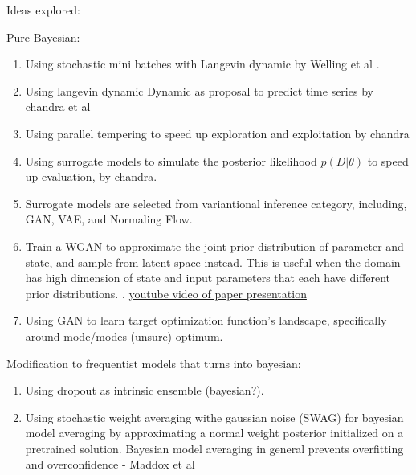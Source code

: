 \documentclass[honours,12pt]{unswthesis}
\numberwithin{equation}{section}
\begin{document}

\noindent Ideas explored: 

Pure Bayesian:

\begin{enumerate}
\item Using stochastic mini batches with Langevin dynamic by Welling et al \cite{StochGradLangevin}.

\item Using langevin dynamic Dynamic as proposal to predict time series by chandra et al \cite{Chandra2017BayesianNL} 

\item Using parallel tempering to speed up exploration and exploitation by chandra \cite{LDPTBNN}

\item Using surrogate models to simulate the posterior likelihood $p(D|\theta)$ to speed up evaluation, by chandra. \cite{SAPTBNN}

\item Surrogate models are selected from variantional inference category, including, GAN, VAE, and Normaling Flow.

\item Train a WGAN to approximate the joint prior distribution of parameter and state, and sample from latent space instead. This is useful when the domain has high dimension of state and input parameters that each have different prior distributions. \cite{mucke2021MCWGAN}. \href{https://www.youtube.com/watch?v=NpgL3Rve2Rg}{youtube video of paper presentation}

\item Using GAN to learn target optimization function's landscape, specifically around mode/modes (unsure) optimum. \cite{OPTGAN2021}
\end{enumerate}

Modification to frequentist models that turns into bayesian:
\begin{enumerate}
\item Using dropout as intrinsic ensemble (bayesian?).

\item Using stochastic weight averaging withe gaussian noise (SWAG) for bayesian model averaging by approximating a normal weight posterior initialized on a pretrained solution. Bayesian model averaging in general prevents overfitting and overconfidence  - Maddox et al \cite{NEURIPS2019_SWAG}
\end{enumerate}
\end{document}
